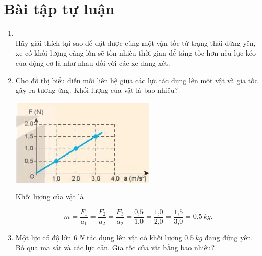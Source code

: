\section{Bài tập tự luận}
\begin{enumerate}[label=\bfseries Bài \arabic*:,leftmargin=1.5cm]
	\item {}\\
	Hãy giải thích tại sao để đặt được cùng một vận tốc từ trạng thái đứng yên, xe có khối lượng càng lớn sẽ tốn nhiều thời gian để tăng tốc hơn nếu lực kéo của động cơ là như nhau đối với các xe đang xét.
	\item {}
	
	
	{Cho đồ thị biểu diễn mối liên hệ giữa các lực tác dụng lên một vật và gia tốc gây ra tương ứng. Khối lượng của vật là bao nhiêu?
		
		\begin{center}
			\includegraphics[scale=1]{../figs/VN10-2022-PH-TP017-2.jpg}
		\end{center}
	}
	
	\hideall
	{	
		
		Khối lượng của vật là
		
		$$m = \dfrac{F_1}{a_1} = \dfrac{F_2}{a_2} = \dfrac{F_3}{a_2} = \dfrac{\text{0,5}}{\text{1,0}} = \dfrac{\text{1,0}}{\text{2,0}} =\dfrac{\text{1,5}}{\text{3,0}} = \SI{0,5}{kg}.$$
		
	}

	\item {}
	
	{
		
		Một lực có độ lớn $\SI{6}{N}$ tác dụng lên vật có khối lượng $\SI{0,5}{kg}$ đang đứng yên. Bỏ qua ma sát và các lực cản. Gia tốc của vật bằng bao nhiêu?
		
	}
	
\end{enumerate}
